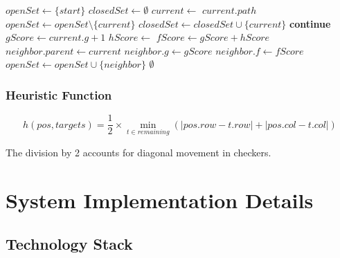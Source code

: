 \documentclass[12pt,a4paper]{article}
\begin{document}
\begin{algorithm}[H]
\caption{A* Capture Path Planning}
\begin{algorithmic}[1]
    \State $openSet \gets \{start\}$
    \State $closedSet \gets \emptyset$
        \State $current \gets$ 
            \State \Return $current.path$ 
        \EndIf
        \State $openSet \gets openSet \setminus \{current\}$
        \State $closedSet \gets closedSet \cup \{current\}$
                \State \textbf{continue}
            \EndIf
            \State $gScore \gets current.g + 1$
            \State $hScore \gets$ 
            \State $fScore \gets gScore + hScore$
                \State $neighbor.parent \gets current$
                \State $neighbor.g \gets gScore$
                \State $neighbor.f \gets fScore$
                \State $openSet \gets openSet \cup \{neighbor\}$
            \EndIf
        \EndFor
    \EndWhile
    \State \Return $\emptyset$ 
\EndFunction
\end{algorithmic}
\end{algorithm}

\subsubsection{Heuristic Function}

\begin{equation}
h(pos, targets) = \frac{1}{2} \times \min_{t \in remaining} (|pos.row - t.row| + |pos.col - t.col|)
\end{equation}

The division by 2 accounts for diagonal movement in checkers.

\section{System Implementation Details}

\subsection{Technology Stack}
\end{document}
